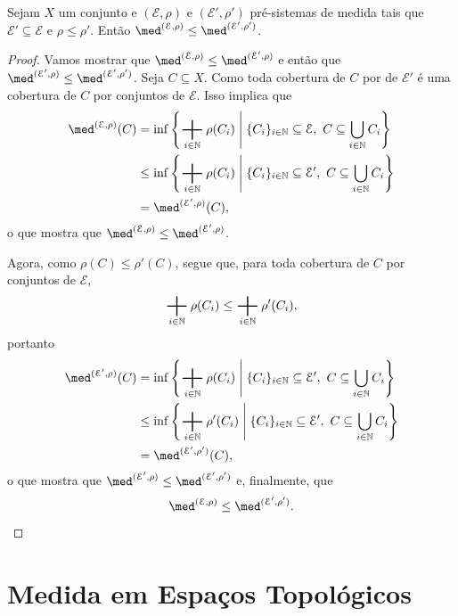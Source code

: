\begin{prop}
Sejam $X$ um conjunto e $(\mathcal E, \rho)$ e $(\mathcal E', \rho')$ pré-sistemas de medida tais que $\mathcal E' \subseteq \mathcal E$ e $\rho \leq \rho'$. Então $\med^{(\mathcal E, \rho)} \leq \med^{(\mathcal E', \rho')}$.
\end{prop}
\begin{proof}
Vamos mostrar que $\med^{(\mathcal E, \rho)} \leq \med^{(\mathcal E', \rho)}$ e então que $\med^{(\mathcal E', \rho)} \leq \med^{(\mathcal E', \rho')}$. Seja $C \subseteq X$. Como toda cobertura de $C$ por de $\mathcal E'$ é uma cobertura de $C$ por conjuntos de $\mathcal E$. Isso implica que
	\begin{align*}
	\med^{(\mathcal E, \rho)}(C) &= \inf \set{\sum_{i \in \N} \rho(C_i)}{\{C_i\}_{i \in \N} \subseteq \mathcal E,\ C \subseteq \bigcup_{i \in \N} C_i} \\
	&\leq \inf \set{\sum_{i \in \N} \rho(C_i)}{\{C_i\}_{i \in \N} \subseteq \mathcal E',\ C \subseteq \bigcup_{i \in \N} C_i} \\
	&= \med^{(\mathcal E', \rho)}(C),
	\end{align*}
o que mostra que $\med^{(\mathcal E, \rho)} \leq \med^{(\mathcal E', \rho)}$.

Agora, como $\rho(C) \leq \rho'(C)$, segue que, para toda cobertura de $C$ por conjuntos de $\mathcal E$,
	\begin{equation*}
	\sum_{i \in \N} \rho(C_i) \leq \sum_{i \in \N} \rho'(C_i),
	\end{equation*}
portanto
	\begin{align*}
	\med^{(\mathcal E', \rho)}(C) &= \inf \set{\sum_{i \in \N} \rho(C_i)}{\{C_i\}_{i \in \N} \subseteq \mathcal E',\ C \subseteq \bigcup_{i \in \N} C_i} \\
	&\leq \inf \set{\sum_{i \in \N} \rho'(C_i)}{\{C_i\}_{i \in \N} \subseteq \mathcal E',\ C \subseteq \bigcup_{i \in \N} C_i} \\
	&= \med^{(\mathcal E', \rho')}(C),
	\end{align*}
o que mostra que $\med^{(\mathcal E', \rho)} \leq \med^{(\mathcal E', \rho')}$ e, finalmente, que
	\begin{equation*}
	\med^{(\mathcal E, \rho)} \leq \med^{(\mathcal E', \rho')}.
	\end{equation*}
\end{proof}







\section{Medida em Espaços Topológicos}

